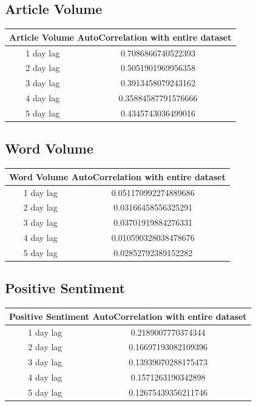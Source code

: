 \subsection{Article Volume}

\begin{center}
\begin{tabular}{ c c }
\hline
\multicolumn{2}{|c|}{Article Volume AutoCorrelation with entire dataset} \\
\hline
1 day lag & 0.7086866740522393 \\
2 day lag & 0.5051901969956358 \\
3 day lag & 0.3913458079243162 \\
4 day lag & 0.35884587791576666 \\
5 day lag & 0.4345743036499016
\end{tabular}
\end{center}

\subsection{Word Volume}

\begin{center}
\begin{tabular}{ c c }
\hline
\multicolumn{2}{|c|}{Word Volume AutoCorrelation with entire dataset} \\
\hline
1 day lag & 0.051170992274889686 \\
2 day lag & 0.03166458556325291 \\
3 day lag & 0.03701919884276331 \\
4 day lag & 0.010590328038478676 \\
5 day lag & 0.02852792389152282
\end{tabular}
\end{center}

\subsection{Positive Sentiment}

\begin{center}
\begin{tabular}{ c c }
\hline
\multicolumn{2}{|c|}{Positive Sentiment AutoCorrelation with entire dataset} \\
\hline
1 day lag & 0.2189007770374344 \\
2 day lag & 0.16697193082109396 \\
3 day lag & 0.13939070288175473 \\
4 day lag & 0.1571263190342898 \\
5 day lag & 0.12675439356211746
\end{tabular}
\end{center}

